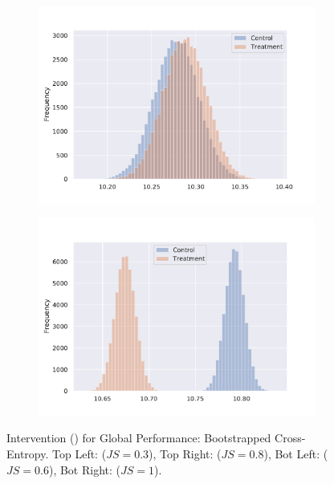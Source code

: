 \begin{exmp}
\begin{figure}[th]
\begin{subfigure}[b]{0.46\linewidth}
  \end{subfigure}
  \begin{subfigure}[b]{0.46\linewidth}
    \includegraphics[width=\linewidth]{graphics/preliminaries/association/cross-entropy-tf1-distribution-clone3-300dpi.pdf}
  \end{subfigure}
  \begin{subfigure}[b]{0.46\linewidth}
    \includegraphics[width=\linewidth]{graphics/preliminaries/association/cross-entropy-tf2-distribution-clone3-300dpi.pdf}
  \end{subfigure}
  \vspace{-0.2cm}
  \caption{\datainterII Intervention (\BigCloneIIITB) for Global Performance: Bootstrapped Cross-Entropy. Top Left: \rnn ($JS=0.3$), Top Right: \gru ($JS=0.8$), Bot Left: \tf ($JS=0.6$), Bot Right: \tfi ($JS=1$).}
  \label{fig:jssimilarity}
  \vspace{-0.3cm}
\end{figure}

\end{exmp}

